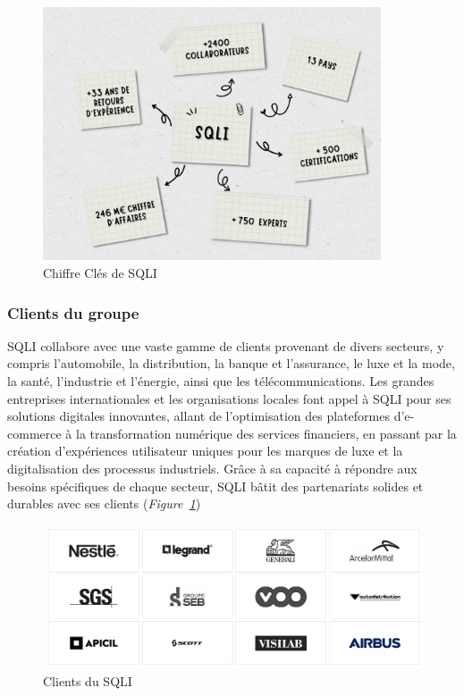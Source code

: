 \begin{figure}[H]
    \centering
    \includegraphics[width=10cm]{Figures/cle chiffre.png} %
    \caption{Chiffre Clés de SQLI}
\end{figure}

\subsubsection{Clients du groupe}

SQLI collabore avec une vaste gamme de clients provenant de divers secteurs, y compris l'automobile, la distribution, la banque et l'assurance, le luxe et la mode, la santé, l'industrie et l'énergie, ainsi que les télécommunications. Les grandes entreprises internationales et les organisations locales font appel à SQLI pour ses solutions digitales innovantes, allant de l'optimisation des plateformes d'e-commerce à la transformation numérique des services financiers, en passant par la création d'expériences utilisateur uniques pour les marques de luxe et la digitalisation des processus industriels. Grâce à sa capacité à répondre aux besoins spécifiques de chaque secteur, SQLI bâtit des partenariats solides et durables avec ses clients (\textit{Figure~\ref{fig:client}})

\begin{figure}[H]
    \centering
    \includegraphics[width=15cm]{Figures/sqli partenaire .png} %
    \caption{Clients du SQLI \cite{SQLI}}
    \label{fig:client}
\end{figure}



